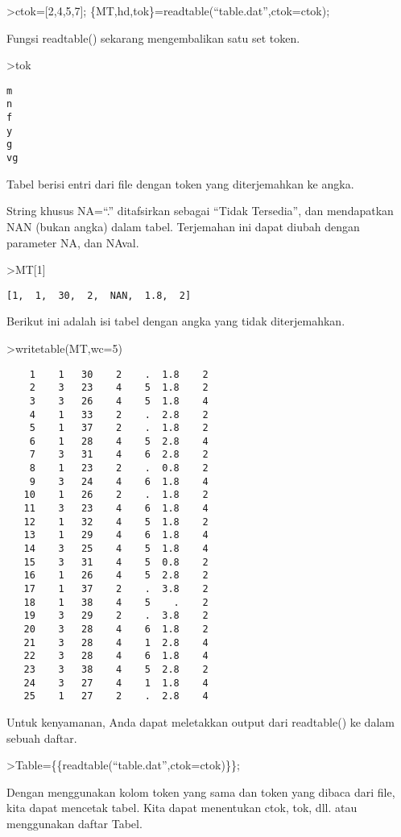 \documentclass[
]{book}
\begin{document}
\textgreater ctok={[}2,4,5,7{]}; \{MT,hd,tok\}=readtable(``table.dat'',ctok=ctok);

Fungsi readtable() sekarang mengembalikan satu set token.

\textgreater tok

\begin{verbatim}
m
n
f
y
g
vg
\end{verbatim}

Tabel berisi entri dari file dengan token yang diterjemahkan ke angka.

String khusus NA=``.'' ditafsirkan sebagai ``Tidak Tersedia'', dan mendapatkan NAN (bukan angka) dalam tabel. Terjemahan ini dapat diubah dengan parameter NA, dan NAval.

\textgreater MT{[}1{]}

\begin{verbatim}
[1,  1,  30,  2,  NAN,  1.8,  2]
\end{verbatim}

Berikut ini adalah isi tabel dengan angka yang tidak diterjemahkan.

\textgreater writetable(MT,wc=5)

\begin{verbatim}
    1    1   30    2    .  1.8    2
    2    3   23    4    5  1.8    2
    3    3   26    4    5  1.8    4
    4    1   33    2    .  2.8    2
    5    1   37    2    .  1.8    2
    6    1   28    4    5  2.8    4
    7    3   31    4    6  2.8    2
    8    1   23    2    .  0.8    2
    9    3   24    4    6  1.8    4
   10    1   26    2    .  1.8    2
   11    3   23    4    6  1.8    4
   12    1   32    4    5  1.8    2
   13    1   29    4    6  1.8    4
   14    3   25    4    5  1.8    4
   15    3   31    4    5  0.8    2
   16    1   26    4    5  2.8    2
   17    1   37    2    .  3.8    2
   18    1   38    4    5    .    2
   19    3   29    2    .  3.8    2
   20    3   28    4    6  1.8    2
   21    3   28    4    1  2.8    4
   22    3   28    4    6  1.8    4
   23    3   38    4    5  2.8    2
   24    3   27    4    1  1.8    4
   25    1   27    2    .  2.8    4
\end{verbatim}

Untuk kenyamanan, Anda dapat meletakkan output dari readtable() ke dalam sebuah daftar.

\textgreater Table=\{\{readtable(``table.dat'',ctok=ctok)\}\};

Dengan menggunakan kolom token yang sama dan token yang dibaca dari file, kita dapat mencetak tabel. Kita dapat menentukan ctok, tok, dll. atau menggunakan daftar Tabel.
\end{document}
